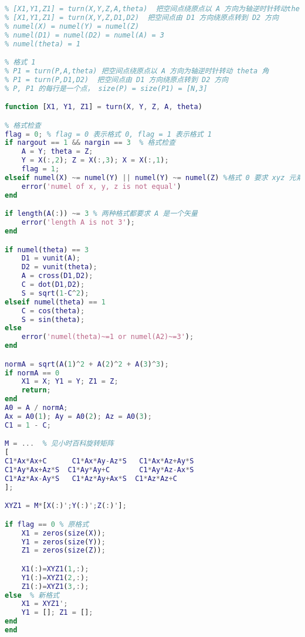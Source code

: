 \begin{lstlisting}[language=matlab, caption=turn.m]
% 格式 0
% [X1,Y1,Z1] = turn(X,Y,Z,A,theta)  把空间点绕原点以 A 方向为轴逆时针转动theta角
% [X1,Y1,Z1] = turn(X,Y,Z,D1,D2)  把空间点由 D1 方向绕原点转到 D2 方向
% numel(X) = numel(Y) = numel(Z)
% numel(D1) = numel(D2) = numel(A) = 3
% numel(theta) = 1

% 格式 1
% P1 = turn(P,A,theta) 把空间点绕原点以 A 方向为轴逆时针转动 theta 角
% P1 = turn(P,D1,D2)  把空间点由 D1 方向绕原点转到 D2 方向
% P, P1 的每行是一个点， size(P) = size(P1) = [N,3]

function [X1, Y1, Z1] = turn(X, Y, Z, A, theta)

% 格式检查
flag = 0; % flag = 0 表示格式 0, flag = 1 表示格式 1
if nargout == 1 && nargin == 3  % 格式检查
    A = Y; theta = Z;
    Y = X(:,2); Z = X(:,3); X = X(:,1);
    flag = 1;
elseif numel(X) ~= numel(Y) || numel(Y) ~= numel(Z) %格式 0 要求 xyz 元素个数相同即可
    error('numel of x, y, z is not equal')
end

if length(A(:)) ~= 3 % 两种格式都要求 A 是一个矢量
    error('length A is not 3');
end

if numel(theta) == 3
    D1 = vunit(A);
    D2 = vunit(theta);
    A = cross(D1,D2);
    C = dot(D1,D2);
    S = sqrt(1-C^2);
elseif numel(theta) == 1
    C = cos(theta);
    S = sin(theta);
else
    error('numel(theta)~=1 or numel(A2)~=3'); 
end

normA = sqrt(A(1)^2 + A(2)^2 + A(3)^3);
if normA == 0
    X1 = X; Y1 = Y; Z1 = Z;
    return;
end
A0 = A / normA;
Ax = A0(1); Ay = A0(2); Az = A0(3);
C1 = 1 - C;

M = ...  % 见小时百科旋转矩阵
[
C1*Ax*Ax+C      C1*Ax*Ay-Az*S   C1*Ax*Az+Ay*S
C1*Ay*Ax+Az*S  C1*Ay*Ay+C       C1*Ay*Az-Ax*S
C1*Az*Ax-Ay*S   C1*Az*Ay+Ax*S  C1*Az*Az+C 
];

XYZ1 = M*[X(:)';Y(:)';Z(:)'];

if flag == 0 % 原格式
    X1 = zeros(size(X));
    Y1 = zeros(size(Y));
    Z1 = zeros(size(Z));

    X1(:)=XYZ1(1,:);
    Y1(:)=XYZ1(2,:);
    Z1(:)=XYZ1(3,:);
else  % 新格式
    X1 = XYZ1';
    Y1 = []; Z1 = [];
end
end
\end{lstlisting}

